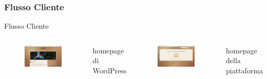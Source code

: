 \documentclass{beamer}
\begin{document}
\begin{frame}
 \frametitle{Flusso Cliente}
 \begin{center}
  {\huge Flusso Cliente}
  \begin{columns}
    \begin{figure}
      \includegraphics[scale=0.1]{images/cl-homepage-wp}
    \end{figure} 
    homepage di WordPress
    \begin{figure}
      \includegraphics[scale=0.1]{images/cl-homepage-p2}
    \end{figure} 
    homepage della piattaforma
  \end{columns}
 \end{center}
\end{frame}
\end{document}
